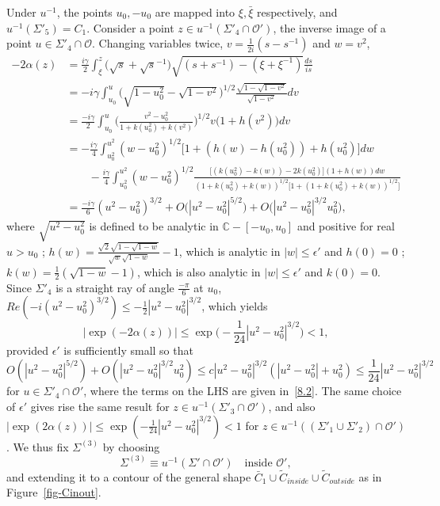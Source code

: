 \documentclass{amsart}
\theoremstyle{definition}
\theoremstyle{remark}
\numberwithin{equation}{section}
\newcommand{\C}{\mathbb C}
\newcommand{\wt}{\widetilde}
\begin{document}
Under $u^{-1}$, the points $u_0, -u_0$ are mapped into $\xi, \bar{\xi}$ respectively,  
and $u^{-1}(\Sigma'_5)=C_1$. 
Consider a point $z\in u^{-1}(\Sigma'_4 \cap\mathcal{O}')$, the inverse image of 
a point $u\in\Sigma'_4 \cap\mathcal{O}$.
Changing variables twice, 
$v=\frac1{2i}(s-s^{-1})$ and $w=v^2$, 
\begin{equation}\label{8.2}
  \begin{split}
    -2\alpha(z)
    &= \frac{i\gamma}{2} \int^z_\xi \bigl(\sqrt{s}+\sqrt{s}^{-1}\bigr)
\sqrt{(s+s^{-1})-(\xi+\xi^{-1})} \frac{ds}{is}\\
    &= -i\gamma \int_{u_0}^u \biggl( \sqrt{1-u_0^2}-\sqrt{1-v^2}\biggr)^{1/2}
\frac{\sqrt{1-\sqrt{1-v^2}}}{\sqrt{1-v^2}} dv\\
    &= \frac{-i\gamma}2 \int_{u_0}^u \biggl( \frac{v^2-u_0^2}
{1+k(u_0^2)+k(v^2)}\biggr)^{1/2} v\bigl( 1+h(v^2)\bigr) dv\\
    &= -\frac{i\gamma}4 \int_{u_0^2}^{u^2} (w-u_0^2)^{1/2}
\bigl[ 1+(h(w)-h(u_0^2))+h(u_0^2)\bigr] dw\\
    &\qquad -\frac{i\gamma}4 \int_{u_0^2}^{u^2} (w-u_0^2)^{1/2}
\frac{\bigl[ (k(u_0^2)-k(w))-2k(u_0^2)\bigr] (1+h(w))dw}
{(1+k(u_0^2)+k(w))^{1/2}
\bigl[ 1+(1+k(u_0^2)+k(w))^{1/2}\bigr]}\\
    &= \frac{-i\gamma}{6} (u^2-u_0^2)^{3/2}
+O\biggl( |u^2-u_0^2|^{5/2}\biggr)
+O\biggl( |u^2-u_0^2|^{3/2}u_0^2\biggr),
  \end{split}
\end{equation}
where $\sqrt{u^2-u_0^2}$ is defined to be analytic in $\C-[-u_0,u_0]$ and 
positive for real $u>u_0$ ; 
$h(w)=\frac{\sqrt{2}\sqrt{1-\sqrt{1-w}}}{\sqrt{w}\sqrt{1-w}}-1$,
which is analytic in $|w|\le\epsilon'$ and $h(0)=0$ ; 
$k(w)=\frac12(\sqrt{1-w}-1)$, which is also analytic
in $|w|\le\epsilon'$ and $k(0)=0$.
Since $\Sigma'_4$ is a straight ray of angle $\frac{-\pi}{6}$ 
at $u_0$, $Re(-i(u^2-u_0^2)^{3/2}) \le -\frac12|u^2-u_0^2|^{3/2}$, 
which yields 
\begin{equation}\label{e-z31}
   |\exp(-2\alpha(z))|\le 
\exp\bigl(-\frac1{24}|u^2-u_0^2|^{3/2}\bigr) < 1, 
\end{equation} 
provided  $\epsilon'$ is sufficiently small so that 
\begin{equation}\label{e-z22}
   O(|u^2-u_0^2|^{5/2})+O(|u^2-u_0^2|^{3/2}u_0^2)
\le c|u^2-u_0^2|^{3/2}(|u^2-u_0^2|+u_0^2) \le\frac1{24} |u^2-u_0^2|^{3/2}
\end{equation}
for $u\in\Sigma'_4\cap\mathcal{O}'$, where the terms on the LHS 
are given in~\eqref{8.2}.
The same choice of $\epsilon'$ gives rise the same 
result for $z\in u^{-1}(\Sigma'_3 \cap\mathcal{O}')$, and 
also $|\exp(2\alpha(z))|\le \exp(-\frac1{24}|u^2-u_0^2|^{3/2}) < 1$ 
for $z\in u^{-1}((\Sigma'_1\cup\Sigma'_2)\cap\mathcal{O}')$.
We thus fix $\Sigma^{(3)}$ by choosing 
\begin{equation}\label{e-z23}
   \Sigma^{(3)}\equiv u^{-1}(\Sigma'\cap\mathcal{O}') 
\quad\text{inside $\mathcal{O}'$}, 
\end{equation}
and extending it to a contour of the general shape 
$\bar{C}_1\cup\wt{C}_{inside}\cup\wt{C}_{outside}$ 
as in Figure~\ref{fig-Cinout}.
\end{document}

